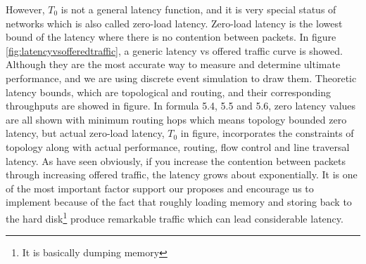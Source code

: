 However, $T_{0}$ is not a general latency function, and it is very special status of networks which is also called zero-load latency.  Zero-load latency is the lowest bound of the latency where there is no contention between packets. In figure \ref{fig:latencyvsofferedtraffic}, a generic latency vs offered traffic curve is showed. Although they are the most accurate way to measure and determine ultimate performance, and we are using discrete event simulation to draw them. Theoretic latency bounds, which are topological and routing, and their corresponding throughputs are showed in figure. In formula 5.4, 5.5 and 5.6, zero latency values are all shown with minimum routing hops which means topology bounded zero latency, but actual zero-load latency, $T_{0}$ in figure, incorporates the constraints of topology along with actual performance, routing, flow control and line traversal latency\cite{0122007514}. As have seen obviously, if you increase the contention between packets through increasing offered traffic, the latency grows about exponentially. It is one of the most important factor support our proposes and encourage us to implement because of the fact that roughly loading memory and storing back to the hard disk\footnote{It is basically dumping memory} produce remarkable traffic which can lead considerable latency.

